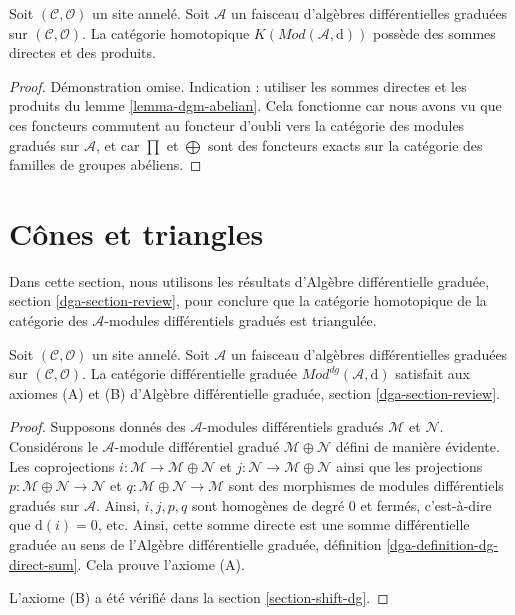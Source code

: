 \begin{lemma}
\label{lemma-homotopy-direct-sums} Soit
$(\mathcal{C}, \mathcal{O})$ un site annelé. Soit
$\mathcal{A}$ un faisceau d'algèbres différentielles graduées sur
$(\mathcal{C}, \mathcal{O})$. La catégorie
homotopique $K(\textit{Mod}(\mathcal{A}, \text{d}))$ possède des
sommes directes et des produits.
\end{lemma}

\begin{proof}
Démonstration omise. Indication : utiliser les sommes directes et
les produits du lemme \ref{lemma-dgm-abelian}. Cela fonctionne car nous
avons vu que ces foncteurs commutent au foncteur d'oubli vers la catégorie
des modules gradués sur $\mathcal{A}$, et car $\prod$ et $\bigoplus$ sont
des foncteurs exacts sur la catégorie des familles de groupes abéliens.
\end{proof}










\section{Cônes et triangles}
\label{section-conclude-triangulated}

\noindent
Dans cette section, nous utilisons les
résultats d'Algèbre différentielle graduée, section \ref{dga-section-review},
pour conclure que la catégorie homotopique
de la catégorie des $\mathcal{A}$-modules différentiels
gradués est triangulée.

\begin{lemma}
\label{lemma-axioms-AB}
Soit $(\mathcal{C}, \mathcal{O})$ un site annelé. Soit
$\mathcal{A}$ un faisceau d'algèbres différentielles graduées
sur $(\mathcal{C}, \mathcal{O})$. La
catégorie différentielle graduée
$\textit{Mod}^{dg}(\mathcal{A}, \text{d})$
satisfait aux axiomes (A) et (B)
d'Algèbre différentielle graduée, section \ref{dga-section-review}.
\end{lemma}

\begin{proof}
Supposons donnés des $\mathcal{A}$-modules différentiels
gradués $\mathcal{M}$ et $\mathcal{N}$. Considérons
le $\mathcal{A}$-module différentiel gradué $\mathcal{M} \oplus \mathcal{N}$
défini de manière évidente. Les coprojections
$i : \mathcal{M} \to \mathcal{M} \oplus \mathcal{N}$ et
$j : \mathcal{N} \to \mathcal{M} \oplus \mathcal{N}$ ainsi que les
projections
$p : \mathcal{M} \oplus \mathcal{N} \to \mathcal{N}$ et
$q : \mathcal{M} \oplus \mathcal{N} \to \mathcal{M}$ sont des morphismes
de modules différentiels gradués sur $\mathcal{A}$. Ainsi,
$i, j, p, q$ sont homogènes de degré
$0$ et fermés, c'est-à-dire que $\text{d}(i) = 0$, etc. Ainsi,
cette somme directe est une somme différentielle graduée au sens de
l'Algèbre différentielle graduée, définition \ref{dga-definition-dg-direct-sum}.
Cela prouve l'axiome (A).

\medskip\noindent
L'axiome (B) a été vérifié dans la section \ref{section-shift-dg}.
\end{proof}

